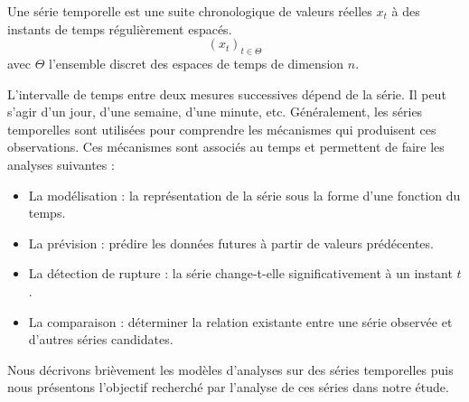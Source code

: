 \begin{definition}
Une s\'erie temporelle est une suite chronologique de valeurs r\'eelles $x_t$ \`a des instants de temps r\'eguli\`erement espac\'es. 
\begin{equation}
(x_t)_{ t \in \Theta}
\end{equation}
avec $\Theta $ l'ensemble discret des espaces de temps de dimension $n$.
\end{definition}
L'intervalle de temps entre deux mesures successives d\'epend de la s\'erie. 
Il peut s'agir d'un jour, d'une semaine, d'une minute, etc.
G\'en\'eralement, les s\'eries temporelles sont utilis\'ees  pour comprendre les m\'ecanismes qui produisent ces observations. Ces m\'ecanismes sont associ\'es au temps et  permettent de faire les analyses suivantes :
\begin{itemize}
	\item La mod\'elisation : la repr\'esentation de la s\'erie sous la forme d'une fonction du temps.
	\item La pr\'evision : pr\'edire les donn\'ees futures \`a partir de valeurs pr\'ed\'ecentes.
	\item La d\'etection de rupture :  la s\'erie change-t-elle significativement \`a un instant $t$.
	\item La comparaison :  d\'eterminer la relation existante entre une s\'erie observ\'ee et d'autres s\'eries candidates.
\end{itemize}
Nous d\'ecrivons bri\`evement les mod\`eles d'analyses sur des s\'eries temporelles puis nous pr\'esentons l'objectif recherch\'e par l'analyse de ces s\'eries dans notre \'etude. 

